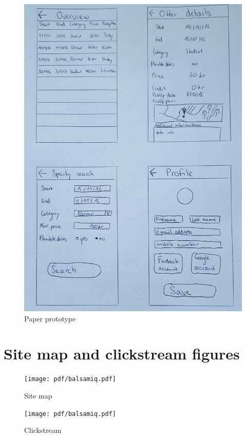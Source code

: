 \documentclass[11pt,twoside,a4paper]{report}
\begin{document}
\begin{appendices}
\begin{figure}
	\centering
	\includegraphics[width=\textwidth]{jpg/paper-prototype-2.jpg}
	\caption{Paper prototype}
	\label{figure:paper-prototype-2}
\end{figure}

\chapter{Site map and clickstream figures}
\thispagestyle{empty}
\newpage

\begin{figure}
	\centering
	\texttt{[image: pdf/balsamiq.pdf]}
	\caption{Site map}
	\label{figure:site-map}
\end{figure}

\begin{figure}
	\centering
	\texttt{[image: pdf/balsamiq.pdf]}
	\caption{Clickstream}
	\label{figure:clickstream}
\end{figure}


\end{appendices}
\end{document}
